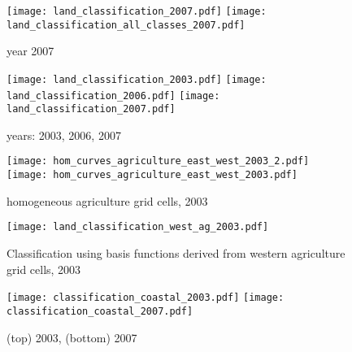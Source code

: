 \documentclass[11pt, oneside]{article}   	%
\begin{document}
\begin{figure}[htbp] %
   \centering
   \texttt{[image: land\_classification\_2007.pdf]} 
	 \texttt{[image: land\_classification\_all\_classes\_2007.pdf]} 
   \caption{year 2007}
   \label{fig:example}
\end{figure}


\begin{figure}[htbp] %
   \centering
   \texttt{[image: land\_classification\_2003.pdf]} 
	 \texttt{[image: land\_classification\_2006.pdf]} 
	 \texttt{[image: land\_classification\_2007.pdf]} 
   \caption{years: 2003, 2006, 2007}
   \label{fig:example}
\end{figure}

\begin{figure}[htbp] %
   \centering
   \texttt{[image: hom\_curves\_agriculture\_east\_west\_2003\_2.pdf]} 
	 \texttt{[image: hom\_curves\_agriculture\_east\_west\_2003.pdf]} 
   \caption{homogeneous agriculture grid cells, 2003}
   \label{fig:example}
\end{figure}

\begin{figure}[htbp] %
   \centering
   \texttt{[image: land\_classification\_west\_ag\_2003.pdf]} 
	 \caption{Classification using basis functions derived from western agriculture grid cells, 2003}
   \label{fig:example}
\end{figure}

\begin{figure}[htbp] %
   \centering
   \texttt{[image: classification\_coastal\_2003.pdf]} 
	 \texttt{[image: classification\_coastal\_2007.pdf]} 
	 \caption{(top) 2003, (bottom) 2007}
   \label{fig:example}
\end{figure}
\end{document}
